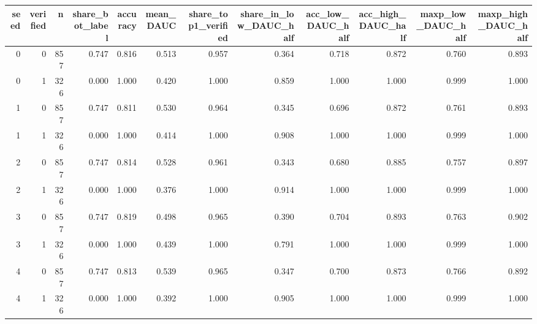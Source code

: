 \begin{tabular}{rrrrrrrrrrrr}
\toprule
seed & verified & n & share_bot_label & accuracy & mean_DAUC & share_top1_verified & share_in_low_DAUC_half & acc_low_DAUC_half & acc_high_DAUC_half & maxp_low_DAUC_half & maxp_high_DAUC_half \\
\midrule
0 & 0 & 857 & 0.747 & 0.816 & 0.513 & 0.957 & 0.364 & 0.718 & 0.872 & 0.760 & 0.893 \\
0 & 1 & 326 & 0.000 & 1.000 & 0.420 & 1.000 & 0.859 & 1.000 & 1.000 & 0.999 & 1.000 \\
1 & 0 & 857 & 0.747 & 0.811 & 0.530 & 0.964 & 0.345 & 0.696 & 0.872 & 0.761 & 0.893 \\
1 & 1 & 326 & 0.000 & 1.000 & 0.414 & 1.000 & 0.908 & 1.000 & 1.000 & 0.999 & 1.000 \\
2 & 0 & 857 & 0.747 & 0.814 & 0.528 & 0.961 & 0.343 & 0.680 & 0.885 & 0.757 & 0.897 \\
2 & 1 & 326 & 0.000 & 1.000 & 0.376 & 1.000 & 0.914 & 1.000 & 1.000 & 0.999 & 1.000 \\
3 & 0 & 857 & 0.747 & 0.819 & 0.498 & 0.965 & 0.390 & 0.704 & 0.893 & 0.763 & 0.902 \\
3 & 1 & 326 & 0.000 & 1.000 & 0.439 & 1.000 & 0.791 & 1.000 & 1.000 & 0.999 & 1.000 \\
4 & 0 & 857 & 0.747 & 0.813 & 0.539 & 0.965 & 0.347 & 0.700 & 0.873 & 0.766 & 0.892 \\
4 & 1 & 326 & 0.000 & 1.000 & 0.392 & 1.000 & 0.905 & 1.000 & 1.000 & 0.999 & 1.000 \\
\bottomrule
\end{tabular}
